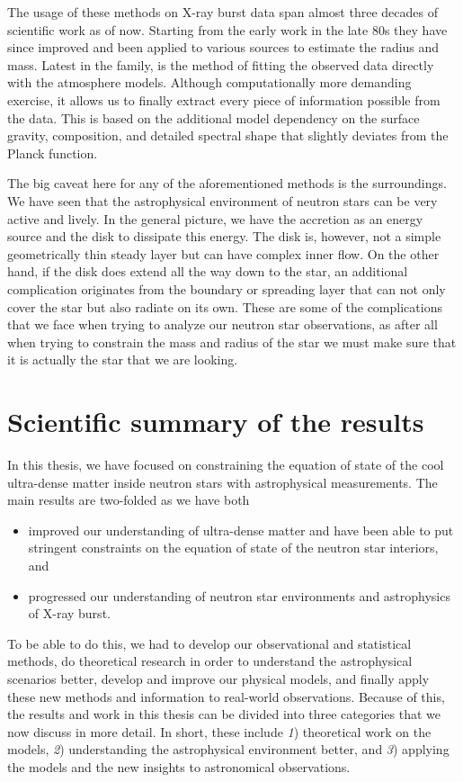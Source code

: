 The usage of these methods on X-ray burst data span almost three decades of scientific work as of now.
Starting from the early work in the late 80s they have since improved and been applied to various sources to estimate the radius and mass.
Latest in the family, is the method of fitting the observed data directly with the atmosphere models.\cite{NMS17}
Although computationally more demanding exercise, it allows us to finally extract every piece of information possible from the data.
This is based on the additional model dependency on the surface gravity, composition, and detailed spectral shape that slightly deviates from the Planck function.


The big caveat here for any of the aforementioned methods is the surroundings.
We have seen that the astrophysical environment of neutron stars can be very active and lively.
In the general picture, we have the accretion as an energy source and the disk to dissipate this energy.
The disk is, however, not a simple geometrically thin steady layer but can have complex inner flow.
On the other hand, if the disk does extend all the way down to the star, an additional complication originates from the boundary or spreading layer that can not only cover the star but also radiate on its own.
These are some of the complications that we face when trying to analyze our neutron star observations, as after all when trying to constrain the mass and radius of the star we must make sure that it is actually the star that we are looking.


\section{Scientific summary of the results}

In this thesis, we have focused on constraining the equation of state of the cool ultra-dense matter inside neutron stars with astrophysical measurements.
The main results are two-folded as we have both
\begin{itemize}
\item improved our understanding of ultra-dense matter and have been able to put stringent constraints on the equation of state of the neutron star interiors, and
\item progressed our understanding of neutron star environments and astrophysics of X-ray burst.
\end{itemize}
To be able to do this, we had to develop our observational and statistical methods, do theoretical research in order to understand the astrophysical scenarios better, develop and improve our physical models, and finally apply these new methods and information to real-world observations.
Because of this, the results and work in this thesis can be divided into three categories that we now discuss in more detail. 
In short, these include \textit{1}) theoretical work on the models, \textit{2}) understanding the astrophysical environment better, and \textit{3}) applying the models and the new insights to astronomical observations.


